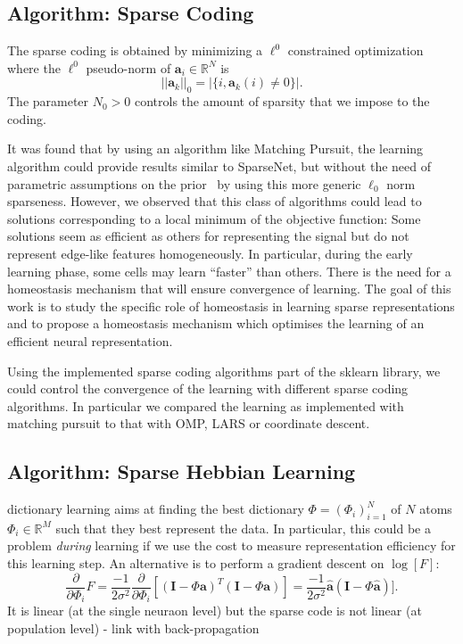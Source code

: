 \documentclass[a4paper, 11pt, draft]{article} %
\newcommand{\umin}[1]{\underset{#1}{\min}\;}
\newcommand{\enscond}[2]{\lbrace #1, #2 \rbrace}
\newcommand{\norm}[1]{|\!| #1 |\!|}
\newcommand{\abs}[1]{\left|#1\right|}
\newcommand{\RR}{\mathbb{R}}
\newcommand{\coef}{\mathbf{a}} %
\newcommand{\image}{\mathbf{I}} %
\newcommand{\dico}{\Phi} %
\begin{document}
\subsection{Algorithm: Sparse Coding}

 The sparse coding is obtained by minimizing a $\ell^0$ constrained optimization
where the $\ell^0$ pseudo-norm of $\coef_i \in \RR^N$ is
\begin{equation} \norm{\coef_k}_0 = \abs{\enscond{i}{\coef_k(i) \neq 0}}. \end{equation}
The parameter $N_0>0$ controls the amount of sparsity that we impose to the coding.


It was found that by using an algorithm like Matching Pursuit, the learning algorithm could provide results similar to {\sc SparseNet}, but without the need of parametric assumptions on the prior~\citep{Perrinet10shl} by using this more generic $\ell_0$ norm sparseness. However, we observed that this class of algorithms could lead to solutions corresponding to a local minimum of the objective function: Some solutions seem as efficient as others for representing the signal but do not represent edge-like features homogeneously. In particular, during the early learning phase, some cells may learn ``faster'' than others. There is the need for a homeostasis mechanism that will ensure convergence of learning. The goal of this work is to study the specific role of homeostasis in learning sparse representations and to propose a homeostasis mechanism which optimises the learning of an efficient neural representation.%

Using the implemented sparse coding algorithms part of the sklearn library, we could control the convergence of the learning with different sparse coding algorithms. In particular we compared the learning as implemented with matching pursuit to that with  OMP, LARS or coordinate descent. 


\subsection{Algorithm: Sparse Hebbian Learning}
dictionary learning aims at finding the best dictionary $\dico=(\dico_i)_{i=1}^N$ of $N$ atoms $\dico_i \in \RR^M$ such that they best represent the data. 
In particular, this could be a problem \emph{during} learning if we use the cost to measure representation efficiency for this learning step. An alternative is to 
perform a gradient descent on $\log[ F ] $:
$$ \frac{\partial }{\partial \dico_i } F = \frac{-1}{2 \sigma^2} \frac{\partial }{\partial \dico_i }[(\image - \dico \coef)^T (\image - \dico \coef)] = \frac{-1}{2 \sigma^2} \hat{\coef} (\image - \dico \hat{\coef})].$$
It is linear (at the single neuraon level) but the sparse code is not linear (at population level) - link with back-propagation
\end{document}
